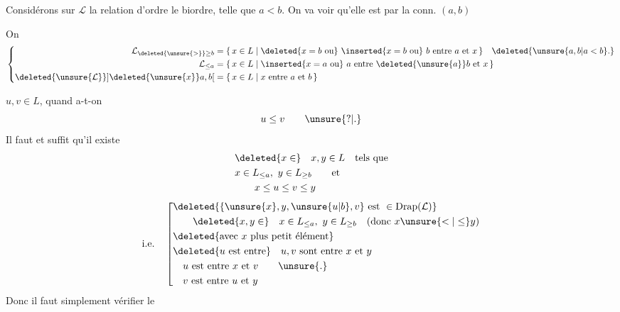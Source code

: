   Considérons sur $\mathcal L$ la relation d'ordre  le biordre, telle que $a<b$. On va voir qu'elle est   par la conn.   $(a,b)$

On  
\[
\left\{\begin{aligned}
\mathcal L_{\deleted{\unsure{>}}\geq b}&=\{\,x\in L\mid\deleted{x=b\text{ ou}}\ \inserted{x=b\text{ ou}}\ b\text{ entre }a\text{ et }x\,\}\quad\deleted{\unsure{a,b|a<b}.}\\
\mathcal L_{\leq a}&=\{\,x\in L\mid\inserted{x=a\text{ ou}}\ a\text{ entre }\deleted{\unsure{a}}b\text{ et }x\,\}\\
\deleted{\unsure{\mathcal L}}\mathopen{]}\deleted{\unsure{x}}a,b\mathclose{[}&=\{\,x\in L\mid x\text{ entre }a\text{ et }b\,\}
\end{aligned}\right.
\]

 $u,v\in L$, quand a-t-on
\[
u\leq v\qquad\unsure{\mathord{?}|.}
\]
Il faut et suffit qu'il existe
\[
\begin{aligned}
&\deleted{x\in}\quad x,y\in L\quad\text{tels que}\\
&x\in L_{\leq a},\ y\in L_{\geq b}\qquad\text{et}\\
&\hspace{2em}x\leq u\leq v\leq y
\end{aligned}
\]
\[
\text{i.e.}\quad
\left[\begin{aligned}
&\deleted{\{\unsure{x},y,\unsure{u|b},v\}\ \text{est }\in\mathrm{Drap}(\mathcal L)}\\
&\qquad\deleted{x,y\in}\quad x\in L_{\leq a},\ y\in L_{\geq b}\quad(\text{donc }x\unsure{<|\leq}y)\\
&\deleted{\text{avec }x\text{ plus petit élément}}\\
&\deleted{u\text{ est entre}}\quad u,v\text{ sont entre }x\text{ et }y\\
&\quad u\text{ est entre }x\text{ et }v\qquad\unsure{.}\\
&\quad v\text{ est entre }u\text{ et }y
\end{aligned}\right.
\]
Donc il faut simplement vérifier le

